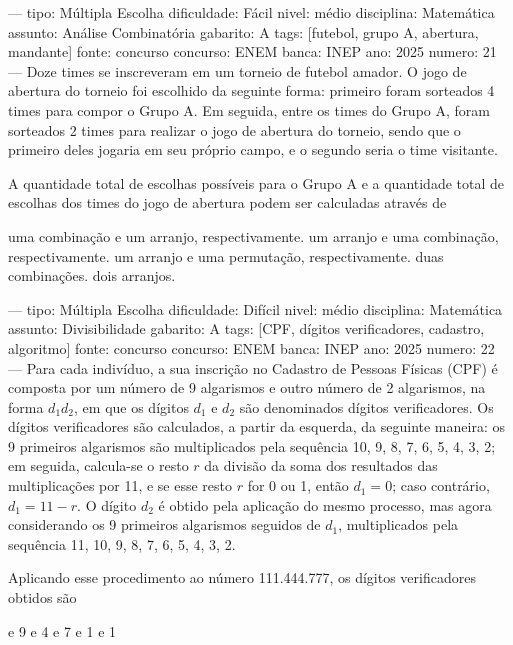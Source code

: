 ---
tipo: Múltipla Escolha
dificuldade: Fácil
nivel: médio
disciplina: Matemática
assunto: Análise Combinatória
gabarito: A
tags: [futebol, grupo A, abertura, mandante]
fonte: concurso
concurso: ENEM
banca: INEP
ano: 2025
numero: 21
---
\question
Doze times se inscreveram em um torneio de futebol amador. O jogo de abertura do torneio foi escolhido da seguinte forma: primeiro foram sorteados 4 times para compor o Grupo A. Em seguida, entre os times do Grupo A, foram sorteados 2 times para realizar o jogo de abertura do torneio, sendo que o primeiro deles jogaria em seu próprio campo, e o segundo seria o time visitante.

A quantidade total de escolhas possíveis para o Grupo A e a quantidade total de escolhas dos times do jogo de abertura podem ser calculadas através de
\begin{choices}
\correctchoice uma combinação e um arranjo, respectivamente.
\choice um arranjo e uma combinação, respectivamente.
\choice um arranjo e uma permutação, respectivamente.
\choice duas combinações.
\choice dois arranjos.
\end{choices}

---
tipo: Múltipla Escolha
dificuldade: Difícil
nivel: médio
disciplina: Matemática
assunto: Divisibilidade
gabarito: A
tags: [CPF, dígitos verificadores, cadastro, algoritmo]
fonte: concurso
concurso: ENEM
banca: INEP
ano: 2025
numero: 22
---
\question
Para cada indivíduo, a sua inscrição no Cadastro de Pessoas Físicas (CPF) é composta por um número de 9 algarismos e outro número de 2 algarismos, na forma \( d_1d_2 \), em que os dígitos \( d_1 \) e \( d_2 \) são denominados dígitos verificadores. Os dígitos verificadores são calculados, a partir da esquerda, da seguinte maneira: os 9 primeiros algarismos são multiplicados pela sequência 10, 9, 8, 7, 6, 5, 4, 3, 2; em seguida, calcula-se o resto \( r \) da divisão da soma dos resultados das multiplicações por 11, e se esse resto \( r \) for 0 ou 1, então \( d_1 = 0 \); caso contrário, \( d_1 = 11-r \). O dígito \( d_2 \) é obtido pela aplicação do mesmo processo, mas agora considerando os 9 primeiros algarismos seguidos de \( d_1 \), multiplicados pela sequência 11, 10, 9, 8, 7, 6, 5, 4, 3, 2.

Aplicando esse procedimento ao número 111.444.777, os dígitos verificadores obtidos são
\begin{oneparchoices}
 e 9
 e 4
 e 7
 e 1
 e 1
\end{oneparchoices}

